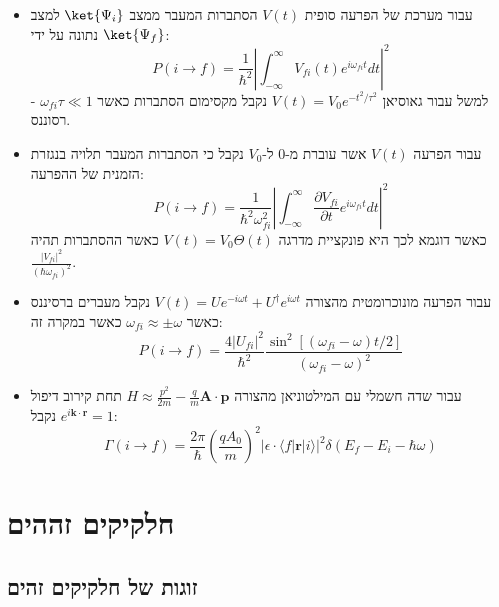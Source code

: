 \documentclass{tstextbook}
\begin{document}
\begin{summary}
  \begin{itemize}
    \item עבור מערכת של הפרעה סופית \(V(t)\) הסתברות המעבר ממצב \(\ket{\Psi_{i}}\) למצב \(\ket{\Psi_{f}}\) נתונה על ידי:
$$P(i\to f)={\frac{1}{\hbar^{2}}}\left|\int_{-\infty}^{\infty}V_{f i}(t)e^{i\omega_{f i}t}d t\right|^{2}$$
למשל עבור גאוסיאן \(V(t)=V_{0}e^{ -t^{2}/\tau^{2} }\) נקבל מקסימום הסתברות כאשר \(\omega_{fi}\tau\ll 1\) - רסוננס.
    \item עבור הפרעה \(V(t)\) אשר עוברת מ-0 ל-\(V_{0}\) נקבל כי הסתברות המעבר תלויה בנגזרת הזמנית של ההפרעה:
$$P(i\to f)=\frac{1}{\hbar^{2}\omega_{f i}^{2}}\left|\int_{-\infty}^{\infty}\frac{\partial V_{f i}}{\partial t}e^{i\omega_{f i}t}d t\right|^{2}$$
כאשר דוגמא לכך היא פונקציית מדרגה \(V(t)=V_{0}\Theta(t)\) כאשר ההסתברות תהיה \(\frac{|V_{fi}|^{2}}{(\hbar \omega_{fi})^{2}}\).
    \item עבור הפרעה מונוכרומטית מהצורה \(V(t)=U e^{-i\omega t}+U^{\dagger}e^{i\omega t}\) נקבל מעברים ברסיננס כאשר \(\omega_{fi}\approx\pm \omega\) כאשר במקרה זה:
$$P(i\to f)=\frac{4|U_{f i}|^{2}}{\hbar^{2}}\frac{\sin^{2}[(\omega_{f i}-\omega)t/2]}{(\omega_{f i}-\omega)^{2}}$$
    \item עבור שדה חשמלי עם המילטוניאן מהצורה \(H\approx \frac{p^{2}}{2m}-\frac{q}{m}\mathbf{A\cdot p}\) תחת קירוב דיפול \(e^{ i\mathbf{k\cdot r} }=1\) נקבל:
$$\Gamma(i\to f)=\frac{2\pi}{\hbar}\left(\frac{q A_{0}}{m}\right)^{2}|\epsilon\cdot\langle f|\mathbf{r}|i\rangle|^{2}\delta(E_{f}-E_{i}-\hbar\omega)$$
  \end{itemize}
\end{summary}
\chapter{חלקיקים זההים}

\section{זוגות של חלקיקים זהים}
\end{document}

